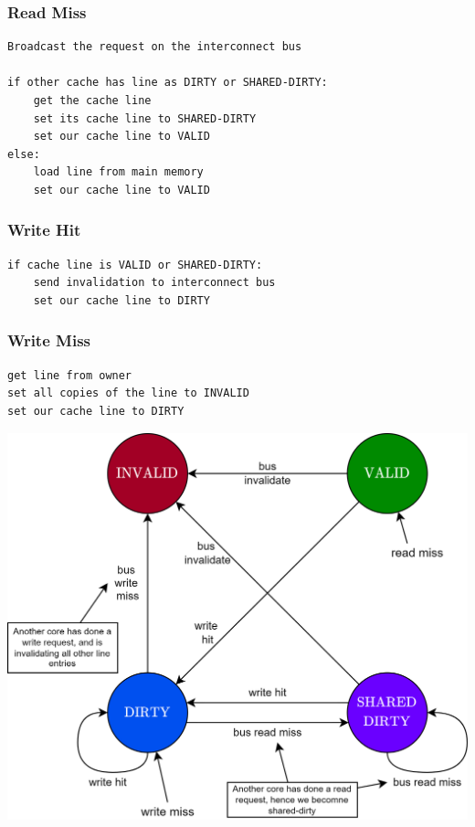\subsubsection{Read Miss}
\begin{minipage}{.5\textwidth}
    \begin{verbatim}
Broadcast the request on the interconnect bus

if other cache has line as DIRTY or SHARED-DIRTY:
    get the cache line
    set its cache line to SHARED-DIRTY
    set our cache line to VALID
else:
    load line from main memory
    set our cache line to VALID
    \end{verbatim}
\end{minipage}
\begin{minipage}{.5\textwidth}
    \subsubsection{Write Hit}
    \begin{verbatim}
if cache line is VALID or SHARED-DIRTY:
    send invalidation to interconnect bus
    set our cache line to DIRTY
    \end{verbatim}
    
    \subsubsection{Write Miss}
    \begin{verbatim}
get line from owner
set all copies of the line to INVALID
set our cache line to DIRTY
    \end{verbatim}
\end{minipage}
\begin{center}
    \includegraphics[width=.7\textwidth]{parallel_programming/images/berkley_transitions.drawio.png}
\end{center}
